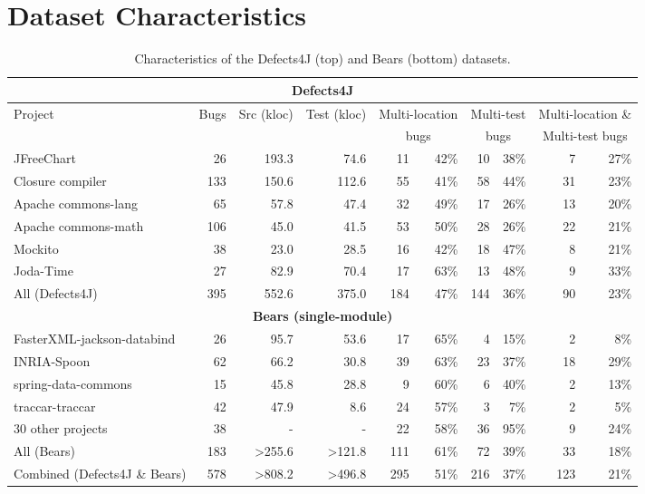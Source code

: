 \documentclass[sigconf, timestamp-false, anonymous=true]{acmart}
\begin{document}
\section{Dataset Characteristics}
\label{sec:data-rq1}

\begin{table*}
\begin{center}
\begin{tabular}{l | rrr  | rr | rr | rr}
\toprule
\multicolumn{10}{c}{\textbf{Defects4J}} \\
\midrule
Project & Bugs & Src (kloc) & Test (kloc) & \multicolumn{2}{c}{Multi-location} 
		& \multicolumn{2}{c}{Multi-test} & \multicolumn{2}{c}{Multi-location \&}\\
&&&&\multicolumn{2}{c}{bugs}&\multicolumn{2}{c}{bugs}&\multicolumn{2}{c}{Multi-test bugs}\\
\midrule
JFreeChart  & 26 & 193.3 & 74.6  & 11 & 42\% & 10 & 38\% & 7 & 27\%\\
Closure compiler & 133 & 150.6 & 112.6 & 55 & 41\% & 58 & 44\% & 31 & 23\%\\
Apache commons-lang & 65 & 57.8 & 47.4  & 32 & 49\% & 17 & 26\% & 13 & 20\%\\
Apache commons-math & 106 & 45.0 & 41.5 & 53 & 50\% & 28 & 26\% & 22 & 21\%\\
Mockito & 38 & 23.0 & 28.5 & 16 & 42\% & 18 & 47\% & 8 & 21\%\\
Joda-Time & 27 & 82.9 & 70.4 & 17 & 63\% & 13 & 48\% & 9 & 33\%\\
\midrule
All (Defects4J) & 395 & 552.6 & 375.0 & 184 & 47\% & 144 & 36\% & 90 & 23\%\\
\midrule
\multicolumn{10}{c}{\textbf{Bears (single-module)}} \\
\midrule
FasterXML-jackson-databind & 26 & 95.7 & 53.6 & 17 & 65\% & 4 & 15\% & 2 & 8\%\\
INRIA-Spoon & 62 & 66.2 & 30.8  & 39 & 63\% & 23 & 37\% & 18 & 29\%\\
spring-data-commons & 15 & 45.8 & 28.8  & 9 & 60\% & 6 & 40\% & 2 & 13\%\\
traccar-traccar & 42 & 47.9 & 8.6 & 24 & 57\% & 3 & 7\% & 2 & 5\%\\
30 other projects & 38 & - & - & 22 & 58\% & 36 & 95\% & 9 & 24\%\\
\midrule
All (Bears) & 183 & >255.6 & >121.8 & 111 & 61\% & 72 & 39\% & 33 & 18\% \\
\midrule
Combined (Defects4J \& Bears) & 578 & >808.2 & >496.8 & 295 & 51\% & 216 & 37\% & 123 & 21\%\\
\bottomrule
\end{tabular}
\end{center}
\caption{\label{tab:dataset-characteristics} Characteristics of the Defects4J (top) and Bears (bottom) datasets.}
\end{table*}
\end{document}
